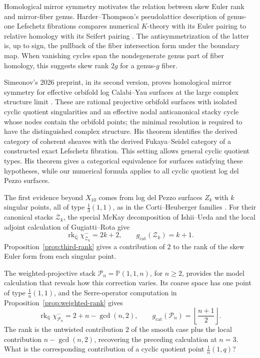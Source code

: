 \documentclass[11pt]{article}
\theoremstyle{plain}
\theoremstyle{definition}
\theoremstyle{remark}
\newcommand{\rk}{\operatorname{rk}}
\newcommand{\Q}{\mathbb Q}
\newcommand{\Pj}{\mathbb P}
\newcommand{\1}{\mathbf 1}
\begin{document}
Homological mirror symmetry motivates the relation between skew Euler rank and mirror-fiber genus.  Harder--Thompson's pseudolattice description of genus-one Lefschetz fibrations compares numerical $K$-theory with its Euler pairing to relative homology with its Seifert pairing \cite[Sections 4.2 and 5]{HarderThompson}.  The antisymmetrization of the latter is, up to sign, the pullback of the fiber intersection form under the boundary map.  When vanishing cycles span the nondegenerate genus part of fiber homology, this suggests skew rank $2g$ for a genus-$g$ fiber.

Simeonov's 2026 preprint, in its second version, proves homological mirror symmetry for effective orbifold log Calabi--Yau surfaces at the large complex structure limit \cite[Definition 1.1 and Theorem 0.1]{Simeonov}.  These are rational projective orbifold surfaces with isolated cyclic quotient singularities and an effective nodal anticanonical stacky cycle whose nodes contain the orbifold points; the minimal resolution is required to have the distinguished complex structure.  His theorem identifies the derived category of coherent sheaves with the derived Fukaya--Seidel category of a constructed exact Lefschetz fibration.  This setting allows general cyclic quotient types.  His theorem gives a categorical equivalence for surfaces satisfying these hypotheses, while our numerical formula applies to all cyclic quotient log del Pezzo surfaces.

The first evidence beyond $X_{10}$ comes from log del Pezzo surfaces $Z_k$ with $k$ singular points, all of type $\frac13(1,1)$, as in the Corti--Heuberger families \cite{CH}.  For their canonical stacks $\mathcal Z_k$, the special McKay decomposition of Ishii--Ueda \cite{IU} and the local adjoint calculation of Gugiatti--Rota \cite[Example 3.5]{GR} give
\[
\rk_{\Q}\chi^-_{\mathcal Z_k}=2k+2,
\qquad
g_{\mathrm{cat}}(\mathcal Z_k)=k+1.
\]
Proposition~\ref{prop:third-rank} gives a contribution of $2$ to the rank of the skew Euler form from each singular point.

The weighted-projective stack $\mathcal P_n=\Pj(1,1,n)$, for $n\ge2$, provides the model calculation that reveals how this correction varies.  Its coarse space has one point of type $\frac1n(1,1)$, and the Serre-operator computation in Proposition~\ref{prop:weighted-rank} gives
\[
\rk_{\Q}\chi^-_{\mathcal P_n}=2+n-\gcd(n,2),
\qquad
g_{\mathrm{cat}}(\mathcal P_n)=\left\lfloor\frac{n+1}{2}\right\rfloor.
\]
The rank is the untwisted contribution $2$ of the smooth case plus the local contribution $n-\gcd(n,2)$, recovering the preceding calculation at $n=3$.  What is the corresponding contribution of a cyclic quotient point $\frac1n(1,q)$?
\end{document}
